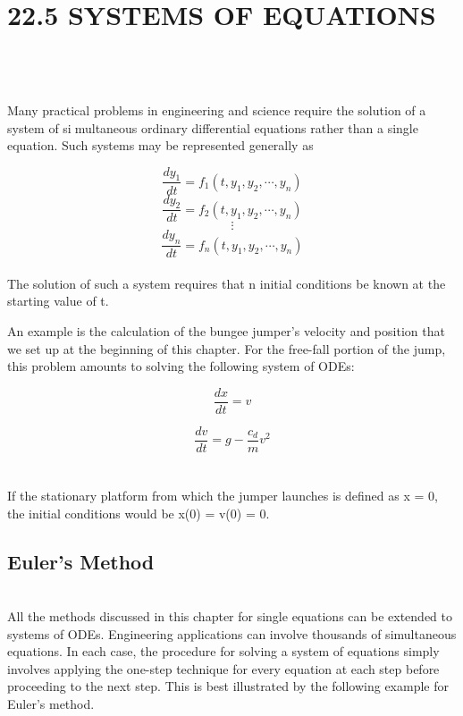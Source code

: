 \vspace{0,6in}
\chapter{22.5 SYSTEMS OF EQUATIONS}
\vspace{0,1in}
\hline\\
\vspace{0,1in}\\
\\
Many practical problems in engineering and science require the solution of a system of simultaneous ordinary differential equations rather than a single equation. Such systems may
be represented generally as

$$\dfrac{dy_1}{dt} = f_1(t,y_1,y_2, \cdots , y_n)$$
\begin{equation}
\tag{22.46}
\dfrac{dy_2}{dt} = f_2(t,y_1,y_2, \cdots, y_n)
\end{equation}
$$\vdots$$
$$\dfrac{dy_n}{dt} = f_n(t,y_1,y_2, \cdots , y_n)$$\\
The solution of such a system requires that n initial conditions be known at the starting
value of t.

An example is the calculation of the bungee jumper’s velocity and position that we set
up at the beginning of this chapter. For the free-fall portion of the jump, this problem
amounts to solving the following system of ODEs:

\begin{equation}
\tag{22.47}
\dfrac{dx}{dt} = v
\end{equation}

\begin{equation}
\tag{22.48}
\dfrac{dv}{dt} = g - \dfrac{c_{d}}{m}v^2
\end{equation}\\
\\
If the stationary platform from which the jumper launches is defined as x = 0, the initial
conditions would be x(0) = v(0) = 0.

\section{ Euler’s Method}
\\
All the methods discussed in this chapter for single equations can be extended to systems
of ODEs. Engineering applications can involve thousands of simultaneous equations. In
each case, the procedure for solving a system of equations simply involves applying the
one-step technique for every equation at each step before proceeding to the next step. This
is best illustrated by the following example for Euler’s method.



